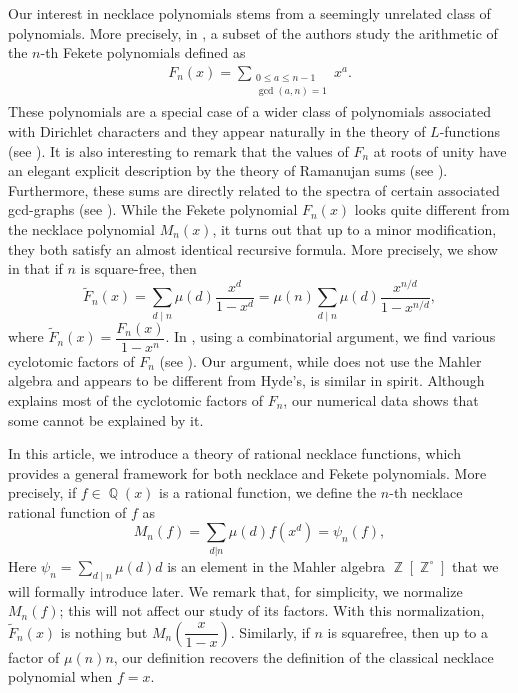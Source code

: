 \documentclass[12t,a4paper]{amsart}
\theoremstyle{definition}
\DeclareMathOperator{\Z}{\mathbb{Z}}
\DeclareMathOperator{\Q}{\mathbb{Q}}
\numberwithin{equation}{section}
\begin{document}
Our interest in necklace polynomials stems from a seemingly  unrelated class of polynomials. More precisely, in \cite{chidambaram2023fekete}, a subset of the authors study the arithmetic of the $n$-th Fekete polynomials defined as
\begin{align*}
\label{def:Fekete}
    F_n(x)= \sum_{\substack{0 \leq a \leq n-1\\ \gcd(a,n)=1}} x^a.
\end{align*}
These polynomials are a special case of a wider class of polynomials associated with Dirichlet characters and they appear naturally in the theory of $L$-functions (see \cite{baker1990oscillations, conrey2000zeros, minavc2023arithmetic}). It is also interesting to remark that the values of $F_n$ at roots of unity have an elegant explicit description by the theory of Ramanujan sums (see \cite{fowler2014ramanujan, ramanujan1918certain}). Furthermore, these sums are directly related to the spectra of certain associated gcd-graphs (see \cite{klotz2007some, nguyen2026gcd}). While the Fekete polynomial $F_n(x)$ looks quite different from the necklace polynomial $M_n(x)$, it turns out that up to a minor modification,  they both satisfy an almost identical recursive formula. More precisely, we show in \cite[Proposition 2.17]{chidambaram2023fekete} that if $n$ is square-free, then
\[ \tilde{F}_n(x)=\sum_{d\mid n}\mu(d)\dfrac{x^d}{1-x^d} = \mu(n)\sum_{d\mid n}\mu(d)\dfrac{x^{{n}/{d}}}{1-x^{n/d}} , \]
where $\tilde{F}_n(x)= \dfrac{F_n(x)}{1-x^n}$. In \cite{chidambaram2023fekete}, using a combinatorial argument, we find various cyclotomic factors of $F_n$ (see \cite[Theorem 2.19]{chidambaram2023fekete}). Our argument, while does not use the Mahler algebra and appears to be different from Hyde's, is similar in spirit. Although \cite[Theorem 2.19]{chidambaram2023fekete} explains most of the cyclotomic factors of $F_n$, our numerical data shows that some cannot be explained by it. 


In this article, we introduce a theory of rational necklace functions, which provides a general framework for both necklace and Fekete polynomials. More precisely, if $f \in \Q(x)$ is a rational function, we define the $n$-th necklace rational function of $f$ as 
\[ M_n(f) = \sum_{d|n} \mu(d) f(x^d) = \psi_n(f), \]
Here $\psi_n = \sum_{d \mid n} \mu(d)d$ is an element in the Mahler algebra $\Z[\Z^{\circ}]$ that we will formally introduce later. We remark that, for simplicity, we normalize $M_n(f)$; this will not affect our study of its factors. With this normalization, $\tilde{F}_n(x)$ is nothing but $M_n\left(\dfrac{x}{1-x} \right)$. Similarly, if $n$ is squarefree, then up to a factor of $\mu(n)n$, our definition recovers the definition of the classical necklace polynomial when $f=x.$ 
\end{document}
